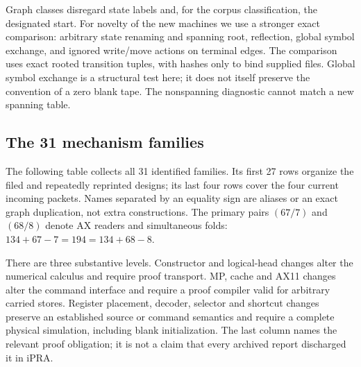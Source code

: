 Graph classes disregard state labels and, for the corpus classification,
the designated start.  For novelty of the new machines we use a stronger
exact comparison: arbitrary state renaming and spanning root, reflection,
global symbol exchange, and ignored write/move actions on terminal edges.
The comparison uses exact rooted transition tuples, with hashes only to
bind supplied files.  Global symbol exchange is a structural test here;
it does not itself preserve the convention of a zero blank tape.
The nonspanning diagnostic cannot match a new spanning table.

\subsection{The 31 mechanism families}

The following table collects all 31 identified families.  Its first 27 rows
organize the filed and repeatedly reprinted designs; its last four rows
cover the four current incoming packets.  Names separated by an equality
sign are aliases or an exact graph duplication, not extra constructions.
The primary pairs \((67/7)\) and \((68/8)\) denote AX readers and simultaneous
folds: \(134+67-7=194=134+68-8\).

There are three substantive levels.  Constructor and logical-head changes
alter the numerical calculus and require proof transport.  MP, cache and
AX11 changes alter the command interface and require a proof compiler valid
for arbitrary carried stores.  Register placement, decoder, selector and
shortcut changes preserve an established source or command semantics and
require a complete physical simulation, including blank initialization.
The last column names the relevant proof obligation; it is not a claim
that every archived report discharged it in \(\mathrm{iPRA}\).

